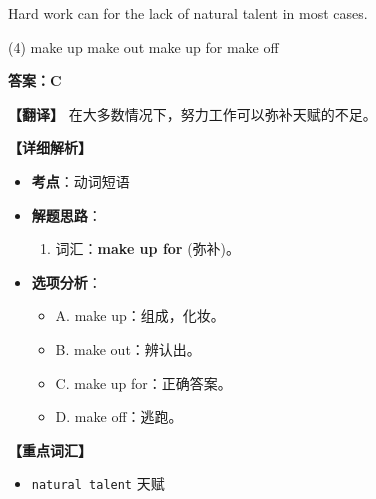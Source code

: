 \documentclass[11pt, a4paper]{article}
\newcommand{\analysis}[4]{
    \begin{solutionbox}
        \textbf{答案：#1}
        
        \textbf{【翻译】} #2
        
        \textbf{【详细解析】}
        #3
        
        \textbf{【重点词汇】}
        #4
    \end{solutionbox}
}
\newcommand{\blank}{\underline{\hspace{1.5cm}}}
\begin{document}
\begin{questions}
    \item Hard work can \blank for the lack of natural talent in most cases.
    \begin{tasks}(4)
        \task make up \task make out \task make up for \task make off
    \end{tasks}
    \analysis{C}{在大多数情况下，努力工作可以弥补天赋的不足。}{
        \begin{itemize}
            \item \textbf{考点}：动词短语
            \item \textbf{解题思路}：
                \begin{enumerate}
                    \item 词汇：\textbf{make up for} (弥补)。
                \end{enumerate}
            \item \textbf{选项分析}：
                \begin{itemize}
                    \item A. make up：组成，化妆。
                    \item B. make out：辨认出。
                    \item C. make up for：正确答案。
                    \item D. make off：逃跑。
                \end{itemize}
        \end{itemize}
    }{
        \begin{itemize}
            \item \texttt{natural talent} 天赋
        \end{itemize}
    }


\end{questions}
\end{document}
